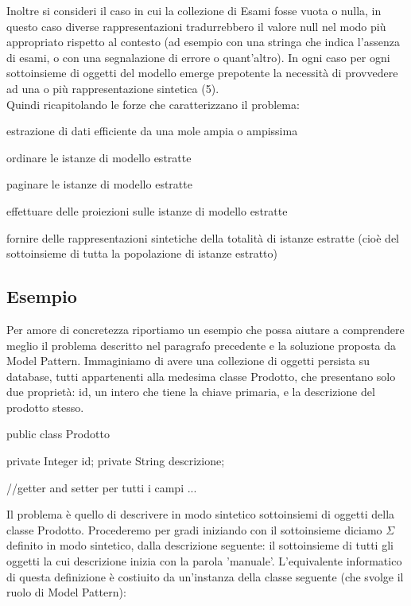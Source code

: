 Inoltre si consideri il caso in cui la collezione di Esami fosse vuota o nulla, in questo caso diverse rappresentazioni tradurrebbero il valore null nel modo più appropriato rispetto al contesto (ad esempio con una stringa che indica l'assenza di esami, o con una segnalazione di errore o quant'altro).  In ogni caso per ogni sottoinsieme di oggetti del modello emerge prepotente la necessità di provvedere ad una o più rappresentazione sintetica (5).\\
Quindi ricapitolando le forze che caratterizzano il problema:
\begin{enumerate*}
  \item estrazione di dati efficiente da una mole ampia o ampissima
  \item ordinare  le istanze di modello estratte
  \item paginare  le istanze di modello estratte
  \item effettuare delle proiezioni sulle istanze di modello estratte
  \item fornire delle rappresentazioni sintetiche della totalità di istanze estratte (cioè del sottoinsieme di tutta la popolazione di istanze estratto)
\end{enumerate*}

\subsection{Esempio}
Per amore di concretezza riportiamo un esempio che possa aiutare a comprendere meglio il problema descritto nel paragrafo precedente e la soluzione proposta da Model Pattern. Immaginiamo di avere una collezione di oggetti persista su database, tutti appartenenti alla medesima classe Prodotto, che presentano solo due proprietà: id, un intero che tiene la chiave primaria, e la descrizione del prodotto stesso. 

\begin{java}
public class Prodotto {
    
    private Integer id;
    private String descrizione;

    //getter and setter per tutti i campi
    ...
}
\end{java}

Il problema è quello di descrivere in modo sintetico sottoinsiemi di oggetti della classe Prodotto. Procederemo per gradi iniziando con il sottoinsieme diciamo $\Sigma$ definito in modo sintetico, dalla descrizione seguente: il sottoinsieme di tutti gli oggetti la cui descrizione inizia con la parola 'manuale'. L'equivalente informatico di questa definizione è costiuito da un'instanza della classe seguente (che svolge il ruolo di Model Pattern):

